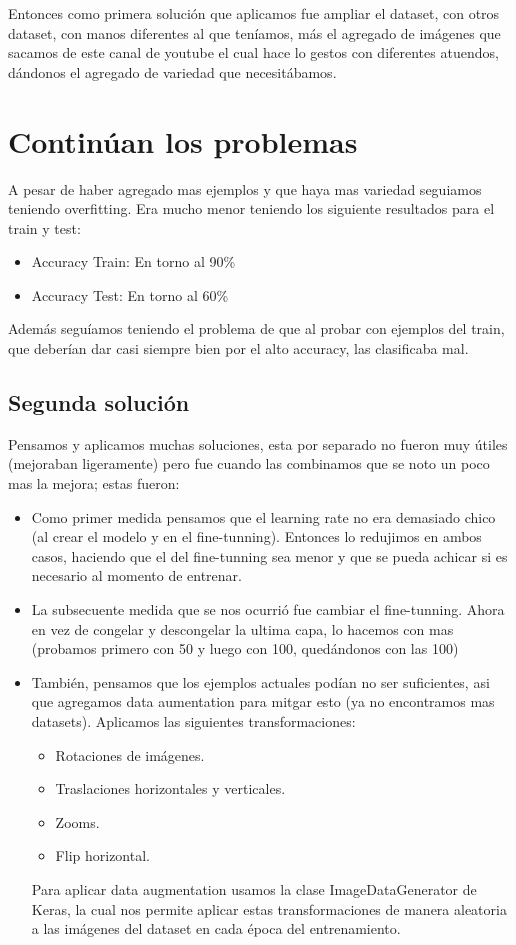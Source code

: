 \documentclass[12pt, titlepage, a4paper]{article}
\begin{document}
Entonces como primera solución que aplicamos fue ampliar el dataset, con otros dataset, con manos diferentes al que teníamos, más el agregado de imágenes que sacamos de este canal de youtube \cite{CanalOtaku}
el cual hace lo gestos con diferentes atuendos, dándonos el agregado de variedad que necesitábamos.\\

\section{Continúan los problemas}
A pesar de haber agregado mas ejemplos y que haya mas variedad seguiamos teniendo overfitting. Era mucho menor teniendo los siguiente resultados para el train y test:

\begin{itemize}
    \item Accuracy Train: En torno al 90\%
    \item Accuracy Test: En torno al 60\%
\end{itemize}

Además seguíamos teniendo el problema de que al probar con ejemplos del train, que deberían dar casi siempre bien por el alto accuracy, las clasificaba mal.

\subsection{Segunda solución}
Pensamos y aplicamos muchas soluciones, esta por separado no fueron muy útiles (mejoraban ligeramente) pero fue cuando las combinamos que se noto un poco mas la mejora; estas fueron:
\begin{itemize}
    \item Como primer medida pensamos que el learning rate no era demasiado chico (al crear el modelo y en el fine-tunning). Entonces lo redujimos en ambos casos, haciendo que el del fine-tunning sea menor y que se pueda achicar si es necesario al momento de entrenar.
    \item La subsecuente medida que se nos ocurrió fue cambiar el fine-tunning. Ahora en vez de congelar y descongelar la ultima capa, lo hacemos con mas (probamos primero con 50 y luego con 100, quedándonos con las 100)
    \item También, pensamos que los ejemplos actuales podían no ser suficientes, asi que agregamos data aumentation para mitgar esto (ya no encontramos mas datasets). Aplicamos las siguientes transformaciones:
    \begin{itemize}
        \item Rotaciones de imágenes.
        \item Traslaciones horizontales y verticales.
        \item Zooms.
        \item Flip horizontal.
    \end{itemize}
    Para aplicar data augmentation usamos la clase ImageDataGenerator de Keras, la cual nos permite aplicar estas transformaciones de manera aleatoria a las imágenes del dataset en cada época del entrenamiento.
\end{itemize}
\end{document}
